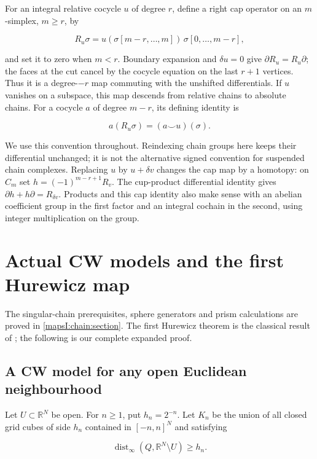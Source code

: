 \documentclass[11pt]{article}
\begin{document}
For an integral relative cocycle \(u\) of degree \(r\), define a right cap operator on an \(m\)-simplex, \(m\geq r\), by

\[
R_u\sigma=u(\sigma[m-r,\ldots,m])\,\sigma[0,\ldots,m-r],
\]

and set it to zero when \(m<r\). Boundary expansion and \(\delta u=0\) give
\(\partial R_u=R_u\partial\); the faces at the cut cancel by the cocycle equation on the last \(r+1\) vertices. Thus it is a degree-\(-r\) map commuting with the unshifted differentials. If \(u\) vanishes on a subspace, this map descends from relative chains to absolute chains. For a cocycle \(a\) of degree \(m-r\), its defining identity is

\[
a(R_u\sigma)=(a\smile u)(\sigma).
\]

We use this convention throughout. Reindexing chain groups here keeps their differential unchanged; it is not the alternative signed convention for suspended chain complexes. Replacing \(u\) by \(u+\delta v\) changes the cap map by a homotopy: on \(C_m\) set \(h=(-1)^{m-r+1}R_v\). The cup-product differential identity gives \(\partial h+h\partial=R_{\delta v}\). Products and this cap identity also make sense with an abelian coefficient group in the first factor and an integral cochain in the second, using integer multiplication on the group.

\section{Actual CW models and the first Hurewicz map}
\label{mapsI:cw:section}

The singular-chain prerequisites, sphere generators and prism calculations are proved in \cref{mapsI:chain:section}. The first Hurewicz theorem is the classical result of \cite[Theorem~4.32]{Hatcher2002}; the following is our complete expanded proof.

\subsection{A CW model for any open Euclidean neighbourhood}
\label{mapsI:cw:cw-open}

Let \(U\subset\mathbb R^N\) be open. For \(n\geq1\), put \(h_n=2^{-n}\). Let \(K_n\) be the union of all closed grid cubes of side \(h_n\) contained in \([-n,n]^N\) and satisfying

\begin{equation}
\operatorname{dist}_{\infty}(Q,\mathbb R^N\setminus U)\geq h_n.
\label{mapsI:cw:eq:1.1}
\end{equation}
\end{document}
